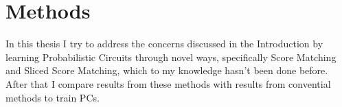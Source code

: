 \chapter{Methods}
\label{cha:methods}

In this thesis I try to address the concerns discussed in the Introduction by learning 
Probabilistic Circuits through novel ways, specifically Score Matching and Sliced Score Matching, which 
to my knowledge hasn't been done before. After that I compare results from these methods with results from convential methods to train PCs.

\section{}
